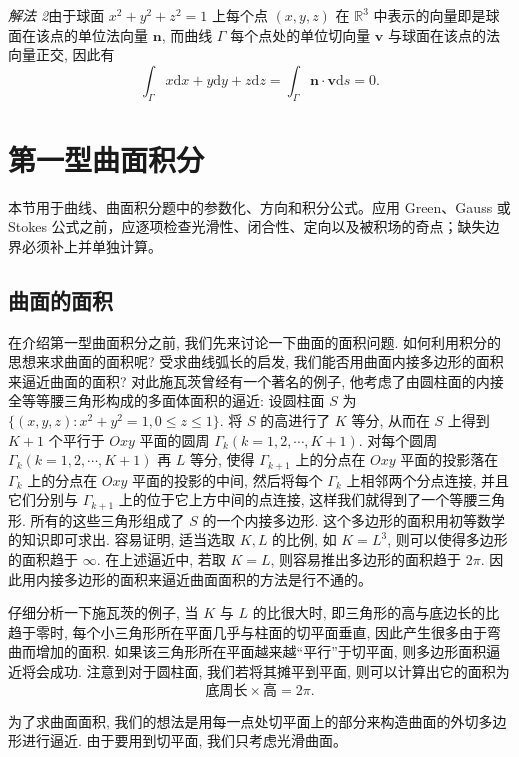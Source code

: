 \documentclass[UTF8,12pt,a4paper,fontset=fandol]{ctexart}
\begin{document}
\noindent\emph{解法 2}\quad 由于球面 $x^2+y^2+z^2=1$ 上每个点 $(x,y,z)$ 在 $\mathbb R^3$ 中表示的向量即是球面在该点的单位法向量 $\boldsymbol n$, 而曲线 $\Gamma$ 每个点处的单位切向量 $\boldsymbol v$ 与球面在该点的法向量正交, 因此有
\[
  \int_\Gamma x\mathrm dx+y\mathrm dy+z\mathrm dz
  =\int_\Gamma \boldsymbol n\cdot\boldsymbol v\mathrm ds=0.
\]



\section{第一型曲面积分}\label{course-16-3}
本节用于曲线、曲面积分题中的参数化、方向和积分公式。应用 Green、Gauss 或 Stokes 公式之前，应逐项检查光滑性、闭合性、定向以及被积场的奇点；缺失边界必须补上并单独计算。

\subsection{曲面的面积}

在介绍第一型曲面积分之前, 我们先来讨论一下曲面的面积问题. 如何利用积分的思想来求曲面的面积呢? 受求曲线弧长的启发, 我们能否用曲面内接多边形的面积来逼近曲面的面积? 对此施瓦茨曾经有一个著名的例子, 他考虑了由圆柱面的内接全等等腰三角形构成的多面体面积的逼近: 设圆柱面 $S$ 为 $\{(x,y,z):x^2+y^2=1,0\leqslant z\leqslant1\}$. 将 $S$ 的高进行了 $K$ 等分, 从而在 $S$ 上得到 $K+1$ 个平行于 $Oxy$ 平面的圆周 $\Gamma_k(k=1,2,\cdots,K+1)$. 对每个圆周 $\Gamma_k(k=1,2,\cdots,K+1)$ 再 $L$ 等分, 使得 $\Gamma_{k+1}$ 上的分点在 $Oxy$ 平面的投影落在 $\Gamma_k$ 上的分点在 $Oxy$ 平面的投影的中间, 然后将每个 $\Gamma_k$ 上相邻两个分点连接, 并且它们分别与 $\Gamma_{k+1}$ 上的位于它上方中间的点连接, 这样我们就得到了一个等腰三角形. 所有的这些三角形组成了 $S$ 的一个内接多边形. 这个多边形的面积用初等数学的知识即可求出. 容易证明, 适当选取 $K,L$ 的比例, 如 $K=L^3$, 则可以使得多边形的面积趋于 $\infty$. 在上述逼近中, 若取 $K=L$, 则容易推出多边形的面积趋于 $2\pi$. 因此用内接多边形的面积来逼近曲面面积的方法是行不通的。

仔细分析一下施瓦茨的例子, 当 $K$ 与 $L$ 的比很大时, 即三角形的高与底边长的比趋于零时, 每个小三角形所在平面几乎与柱面的切平面垂直, 因此产生很多由于弯曲而增加的面积. 如果该三角形所在平面越来越“平行”于切平面, 则多边形面积逼近将会成功. 注意到对于圆柱面, 我们若将其摊平到平面, 则可以计算出它的面积为
\[
  \text{底周长}\times\text{高}=2\pi.
\]

为了求曲面面积, 我们的想法是用每一点处切平面上的部分来构造曲面的外切多边形进行逼近. 由于要用到切平面, 我们只考虑光滑曲面。
\end{document}
